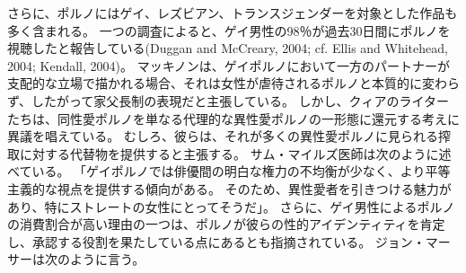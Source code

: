 \documentclass[paper=a4,book,openany]{jlreq}
\newcommand{\ig}[1]{}           %
\begin{document}
さらに、ポルノにはゲイ、レズビアン、トランスジェンダーを対象とした作品も多く含まれる。
一つの調査によると、ゲイ男性の98％が過去30日間にポルノを視聴したと報告している(Duggan and McCreary, 2004; cf. Ellis and Whitehead, 2004; Kendall, 2004)。
\nocite{duggan04:_body_image_eatin_disor_drive}\nocite{ellis04:_porn_again}
\nocite{kendall04:_educat_gay_male_youth}
マッキノンは、ゲイポルノにおいて一方のパートナーが支配的な立場で描かれる場合、それは女性が虐待されるポルノと本質的に変わらず、したがって家父長制の表現だと主張している\citep[pp.178--179]{mackinnon89:_towar_femin_theor_of_state}。
しかし、クィアのライターたちは、同性愛ポルノを単なる代理的な異性愛ポルノの一形態に還元する考えに異議を唱えている。
むしろ、彼らは、それが多くの異性愛ポルノに見られる搾取に対する代替物を提供すると主張する。
サム・マイルズ医師\ig{Sam Miles}は次のように述べている。
「ゲイポルノでは俳優間の明白な権力の不均衡が少なく、より平等主義的な視点を提供する傾向がある。
そのため、異性愛者を引きつける魅力があり、特にストレートの女性にとってそうだ」\citep{bloodworth18:_this_is_why_straig_men}。
さらに、ゲイ男性によるポルノの消費割合が高い理由の一つは、ポルノが彼らの性的アイデンティティを肯定し、承認する役割を果たしている点にあるとも指摘されている。
ジョン・マーサーは次のように言う。
\end{document}
